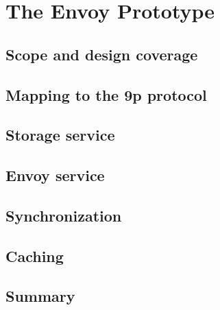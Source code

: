 \chapter{The Envoy Prototype}

\section{Scope and design coverage}
\section{Mapping to the 9p protocol}
\section{Storage service}
\section{Envoy service}
\section{Synchronization}
\section{Caching}

\section{Summary}